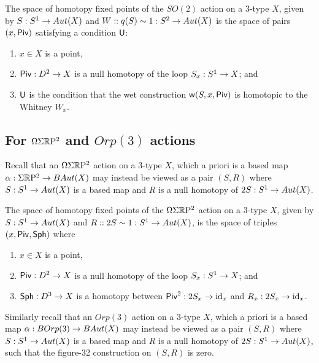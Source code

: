 \documentclass{amsart}
\begin{document}
\begin{proposition}
The space of homotopy fixed points of the $SO(2)$ action on a 3-type $X$, given by $S: S^1 \rightarrow Aut(X)$ and $W :: q(S) \sim 1 : S^2 \to Aut(X)$ is the space of pairs $(x,\mathsf{Piv})$ satisfying a condition $\mathsf{U}$:
\begin{enumerate}
\item $x \in X$ is a point,
\item $\mathsf{Piv}: D^2 \rightarrow X$ is a null homotopy of the loop $S_x: S^1 \rightarrow X$; and
\item $\mathsf{U}$ is the condition that the wet construction $\mathsf{w}(S,x,\mathsf{Piv})$ is homotopic to the Whitney $W_x$.
\end{enumerate}
\end{proposition}

\subsection{For $\Omega \Sigma \mathbb R \mathrm{P}^2$ and $Orp(3)$ actions}

Recall that an $\Omega \Sigma \mathbb R \mathrm{P}^2$ action on a 3-type $X$, which a priori is a based map $\alpha: \Sigma \mathbb R \mathrm{P}^2 \rightarrow BAut(X)$ may instead be viewed as a pair $(S,R)$ where $S : S^1 \rightarrow Aut(X)$ is a based map and $R$ is a null homotopy of $2S : S^1 \rightarrow Aut(X)$.

\begin{proposition}
The space of homotopy fixed points of the $\Omega \Sigma \mathbb R \mathrm{P}^2$ action on a 3-type $X$, given by $S: S^1 \rightarrow Aut(X)$ and $R:: 2S \sim 1 : S^1 \rightarrow Aut(X)$, is the space of triples $(x, \mathsf{Piv}, \mathsf{Sph})$ where
\begin{enumerate}
\item $x \in X$ is a point,
\item $\mathsf{Piv}: D^2 \rightarrow X$ is a null homotopy of the loop $S_x: S^1 \rightarrow X$; and
\item $\mathsf{Sph}: D^3 \rightarrow X$ is a homotopy between $\mathsf{Piv}^2 : 2 S_x \rightarrow \mathrm{id}_x$ and $R_x: 2 S_x \rightarrow \mathrm{id}_x$.
\end{enumerate}
\end{proposition}

Similarly recall that an $Orp(3)$ action on a 3-type $X$, which a priori is a based map $\alpha: BOrp(3) \rightarrow BAut(X)$ may instead be viewed as a pair $(S,R)$ where $S : S^1 \rightarrow Aut(X)$ is a based map and $R$ is a null homotopy of $2S : S^1 \rightarrow Aut(X)$, such that the figure-32 construction on $(S,R)$ is zero.
\end{document}
